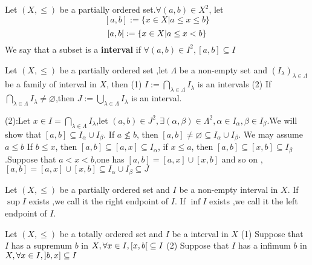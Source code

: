 \documentclass{book}
\numberwithin{equation}{section}
\begin{document}
\begin{definitionenv}
    Let $(X,\le)$ be a partially ordered set.$\forall (a,b)\in X^2$, let 
    $$[a,b]:=\{x\in X|a\le x\le b \}$$
     $$\interval[open right]{a}{b}:=\{x\in X|a\le x <b\}$$ We say that a subset is a \textbf{interval} if $\forall (a,b)\in I^2 ,[a,b]\subseteq I$
\end{definitionenv}
\begin{propositionenv}
    Let $(X,\le)$ be a partially ordered set ,let $\Lambda$ be a non-empty set and $(I_\lambda)_{\lambda\in \Lambda}$ be a family of interval in $X$, then 
    \newline
    (1) $\displaystyle I:=\bigcap _{\lambda\in \Lambda}I_\lambda$ is an intervals
    \newline
    (2) If $\displaystyle \bigcap _{\lambda\in \Lambda}I_\lambda\not=\varnothing $,then $\displaystyle J:=\bigcup_{\lambda\in \Lambda}I_\lambda$ is an interval.
\end{propositionenv}
\begin{proofenv}
    (2):Let $x\in I=\bigcap _{\lambda\in \Lambda}I_\lambda$,let $(a,b)\in J^2,\exists (\alpha,\beta )\in \Lambda^2,\alpha\in I_\alpha,\beta\in I_\beta$.We will show that $[a,b]\subseteq I_\alpha\cup I_\beta$. If $a\not\le b $, then $[a,b]\not =\varnothing\subseteq I_\alpha\cup I_\beta $. We may assume $a\le b $
    \newline 
    If $b\le x$, then $[a,b]\subseteq [a,x]\subseteq I_\alpha$, if $x\le a $, then $[a,b]\subseteq [x,b]\subseteq I_\beta$.Suppose that $a<x<b$,one has $[a,b]=[a,x]\cup[x,b]$ and so on , $[a,b]=[a,x]\cup[x,b]\subseteq I_\alpha\cup I_\beta \subseteq J$

\end{proofenv}
\begin{definitionenv}
    Let $(X,\le )$ be a partially ordered set and $I $ be a non-empty interval in $X$. 
    \newline
    If $\sup I$ exists ,we call it the right endpoint of $I$.
    \newline
    If $\inf I$ exists ,we call it the left endpoint of $I$.
\end{definitionenv}
\begin{propositionenv}
   Let $(X,\le )$ be a totally ordered set and $I $ be a interval in $X$ 
   \newline
   (1) Suppose that $I$ has a supremum $b$ in $X,\forall x\in I,\interval[open right]{x}{b}\subseteq I$
   \newline
   (2) Suppose that $I$ has a infimum $b$ in $X,\forall x\in I,\interval[open left]{b}{x}\subseteq I$
\end{propositionenv}
\end{document}
